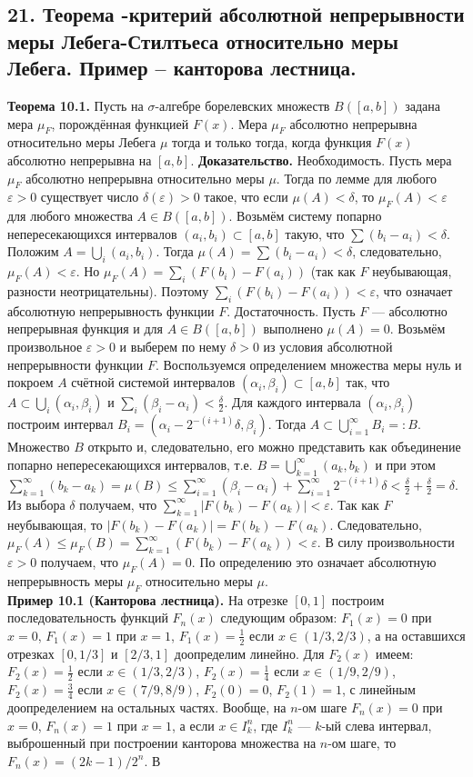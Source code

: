 \documentclass[12pt]{article}
\begin{document}
\subsection*{21. Теорема -критерий абсолютной непрерывности меры Лебега-Стилтьеса относительно
меры Лебега. Пример – канторова лестница.}
\textbf{Теорема 10.1.} Пусть на $\sigma$-алгебре борелевских множеств $B([a,b])$ задана мера $\mu_F$, порождённая функцией $F(x)$. Мера $\mu_F$ абсолютно непрерывна относительно меры Лебега $\mu$ тогда и только тогда, когда функция $F(x)$ абсолютно непрерывна на $[a,b]$. \textbf{Доказательство.} Необходимость. Пусть мера $\mu_F$ абсолютно непрерывна относительно меры $\mu$. Тогда по лемме для любого $\varepsilon>0$ существует число $\delta(\varepsilon)>0$ такое, что если $\mu(A)<\delta$, то $\mu_F(A)<\varepsilon$ для любого множества $A\in B([a,b])$. Возьмём систему попарно непересекающихся интервалов $(a_i,b_i)\subset[a,b]$ такую, что $\sum(b_i-a_i)<\delta$. Положим $A=\bigcup_i(a_i,b_i)$. Тогда $\mu(A)=\sum(b_i-a_i)<\delta$, следовательно, $\mu_F(A)<\varepsilon$. Но $\mu_F(A)=\sum_i(F(b_i)-F(a_i))$ (так как $F$ неубывающая, разности неотрицательны). Поэтому $\sum_i(F(b_i)-F(a_i))<\varepsilon$, что означает абсолютную непрерывность функции $F$. Достаточность. Пусть $F$ — абсолютно непрерывная функция и для $A\in B([a,b])$ выполнено $\mu(A)=0$. Возьмём произвольное $\varepsilon>0$ и выберем по нему $\delta>0$ из условия абсолютной непрерывности функции $F$. Воспользуемся определением множества меры нуль и покроем $A$ счётной системой интервалов $(\alpha_i,\beta_i)\subset[a,b]$ так, что $A\subset\bigcup_i(\alpha_i,\beta_i)$ и $\sum_i(\beta_i-\alpha_i)<\tfrac{\delta}{2}$. Для каждого интервала $(\alpha_i,\beta_i)$ построим интервал $B_i=(\alpha_i-2^{-(i+1)}\delta,\beta_i)$. Тогда $A\subset\bigcup_{i=1}^\infty B_i=:B$. Множество $B$ открыто и, следовательно, его можно представить как объединение попарно непересекающихся интервалов, т.е. $B=\bigcup_{k=1}^\infty(a_k,b_k)$ и при этом $\sum_{k=1}^\infty(b_k-a_k)=\mu(B)\leq\sum_{i=1}^\infty(\beta_i-\alpha_i)+\sum_{i=1}^\infty 2^{-(i+1)}\delta<\tfrac{\delta}{2}+\tfrac{\delta}{2}=\delta$. Из выбора $\delta$ получаем, что $\sum_{k=1}^\infty|F(b_k)-F(a_k)|<\varepsilon$. Так как $F$ неубывающая, то $|F(b_k)-F(a_k)|=F(b_k)-F(a_k)$. Следовательно, $\mu_F(A)\leq\mu_F(B)=\sum_{k=1}^\infty(F(b_k)-F(a_k))<\varepsilon$. В силу произвольности $\varepsilon>0$ получаем, что $\mu_F(A)=0$. По определению это означает абсолютную непрерывность меры $\mu_F$ относительно меры $\mu$. \\\textbf{Пример 10.1 (Канторова лестница).} На отрезке $[0,1]$ построим последовательность функций $F_n(x)$ следующим образом: $F_1(x)=0$ при $x=0$, $F_1(x)=1$ при $x=1$, $F_1(x)=\tfrac{1}{2}$ если $x\in(1/3,2/3)$, а на оставшихся отрезках $[0,1/3]$ и $[2/3,1]$ доопределим линейно. Для $F_2(x)$ имеем: $F_2(x)=\tfrac{1}{2}$ если $x\in(1/3,2/3)$, $F_2(x)=\tfrac{1}{4}$ если $x\in(1/9,2/9)$, $F_2(x)=\tfrac{3}{4}$ если $x\in(7/9,8/9)$, $F_2(0)=0$, $F_2(1)=1$, с линейным доопределением на остальных частях. Вообще, на $n$-ом шаге $F_n(x)=0$ при $x=0$, $F_n(x)=1$ при $x=1$, а если $x\in I_k^n$, где $I_k^n$ — $k$-ый слева интервал, выброшенный при построении канторова множества на $n$-ом шаге, то $F_n(x)=(2k-1)/2^n$. В 
\end{document}
